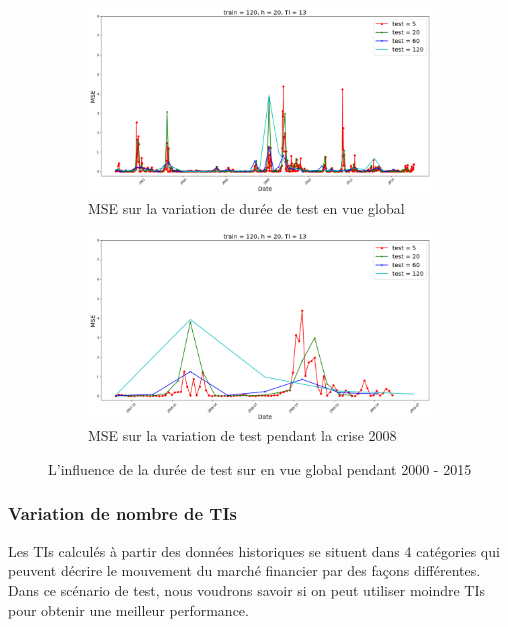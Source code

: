 \begin{figure}[H]
	\centering
	\begin{subfigure}{.5\textwidth}
	\includegraphics[width=.9\linewidth, scale=0.2]
	{plot/MSE_test_global.png}
	\caption{MSE sur la variation de durée de test en vue global}
	\label{fig:test_g}
	\end{subfigure}%
	\begin{subfigure}{.5\textwidth}
	\centering
	\includegraphics[width=.9\linewidth, scale=0.2]
	{plot/MSE_test_2008.png}
	\caption{MSE sur la variation de test pendant la crise 2008}
	\label{fig:test_2008}
	\end{subfigure}
\caption{L'influence de la durée de test sur en vue global pendant 2000 - 2015}
\label{fig:MSE_test}
\end{figure}


\subsubsection{Variation de nombre de TIs}

Les TIs calculés à partir des données historiques se situent dans 4 catégories qui peuvent décrire le mouvement du marché financier par des façons différentes. Dans ce scénario de test, nous voudrons savoir si on peut utiliser moindre TIs pour obtenir une meilleur performance. \\

